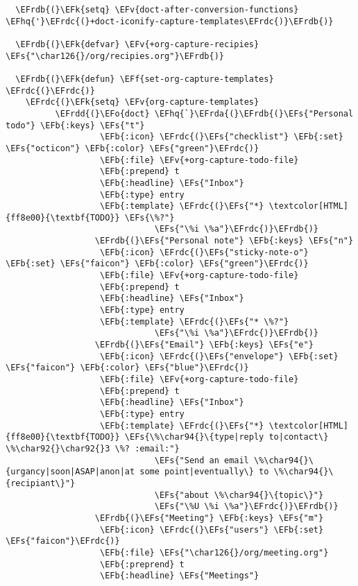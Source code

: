 \documentclass[c]{article}
\theoremstyle{plain}%
\theoremstyle{definition}
\theoremstyle{remark}
\newcommand{\EFs}[1]{\textcolor{EFs}{#1}} %
\newcommand{\EFk}[1]{\textcolor{EFk}{#1}} %
\newcommand{\EFb}[1]{\textcolor{EFb}{#1}} %
\newcommand{\EFf}[1]{\textcolor{EFf}{#1}} %
\newcommand{\EFv}[1]{\textcolor{EFv}{#1}} %
\newcommand{\EFo}[1]{\textcolor{EFo}{#1}} %
\newcommand{\EFhq}[1]{\textcolor{EFhq}{#1}} %
\newcommand{\EFrda}[1]{\textcolor{EFrda}{#1}} %
\newcommand{\EFrdb}[1]{\textcolor{EFrdb}{#1}} %
\newcommand{\EFrdc}[1]{\textcolor{EFrdc}{#1}} %
\newcommand{\EFrdd}[1]{\textcolor{EFrdd}{#1}} %
\begin{document}
\begin{Code}
\begin{Verbatim}
  \EFrdb{(}\EFk{setq} \EFv{doct-after-conversion-functions} \EFhq{'}\EFrdc{(}+doct-iconify-capture-templates\EFrdc{)}\EFrdb{)}

  \EFrdb{(}\EFk{defvar} \EFv{+org-capture-recipies}  \EFs{"\char126{}/org/recipies.org"}\EFrdb{)}

  \EFrdb{(}\EFk{defun} \EFf{set-org-capture-templates} \EFrdc{(}\EFrdc{)}
    \EFrdc{(}\EFk{setq} \EFv{org-capture-templates}
          \EFrdd{(}\EFo{doct} \EFhq{`}\EFrda{(}\EFrdb{(}\EFs{"Personal todo"} \EFb{:keys} \EFs{"t"}
                   \EFb{:icon} \EFrdc{(}\EFs{"checklist"} \EFb{:set} \EFs{"octicon"} \EFb{:color} \EFs{"green"}\EFrdc{)}
                   \EFb{:file} \EFv{+org-capture-todo-file}
                   \EFb{:prepend} t
                   \EFb{:headline} \EFs{"Inbox"}
                   \EFb{:type} entry
                   \EFb{:template} \EFrdc{(}\EFs{"*} \textcolor[HTML]{ff8e00}{\textbf{TODO}} \EFs{\%?"}
                              \EFs{"\%i \%a"}\EFrdc{)}\EFrdb{)}
                  \EFrdb{(}\EFs{"Personal note"} \EFb{:keys} \EFs{"n"}
                   \EFb{:icon} \EFrdc{(}\EFs{"sticky-note-o"} \EFb{:set} \EFs{"faicon"} \EFb{:color} \EFs{"green"}\EFrdc{)}
                   \EFb{:file} \EFv{+org-capture-todo-file}
                   \EFb{:prepend} t
                   \EFb{:headline} \EFs{"Inbox"}
                   \EFb{:type} entry
                   \EFb{:template} \EFrdc{(}\EFs{"* \%?"}
                              \EFs{"\%i \%a"}\EFrdc{)}\EFrdb{)}
                  \EFrdb{(}\EFs{"Email"} \EFb{:keys} \EFs{"e"}
                   \EFb{:icon} \EFrdc{(}\EFs{"envelope"} \EFb{:set} \EFs{"faicon"} \EFb{:color} \EFs{"blue"}\EFrdc{)}
                   \EFb{:file} \EFv{+org-capture-todo-file}
                   \EFb{:prepend} t
                   \EFb{:headline} \EFs{"Inbox"}
                   \EFb{:type} entry
                   \EFb{:template} \EFrdc{(}\EFs{"*} \textcolor[HTML]{ff8e00}{\textbf{TODO}} \EFs{\%\char94{}\{type|reply to|contact\} \%\char92{}\char92{}3 \%? :email:"}
                              \EFs{"Send an email \%\char94{}\{urgancy|soon|ASAP|anon|at some point|eventually\} to \%\char94{}\{recipiant\}"}
                              \EFs{"about \%\char94{}\{topic\}"}
                              \EFs{"\%U \%i \%a"}\EFrdc{)}\EFrdb{)}
                  \EFrdb{(}\EFs{"Meeting"} \EFb{:keys} \EFs{"m"}
                   \EFb{:icon} \EFrdc{(}\EFs{"users"} \EFb{:set} \EFs{"faicon"}\EFrdc{)}
                   \EFb{:file} \EFs{"\char126{}/org/meeting.org"}
                   \EFb{:preprend} t
                   \EFb{:headline} \EFs{"Meetings"}

\end{Verbatim}
\end{Code}
\end{document}
